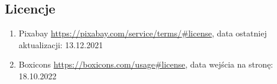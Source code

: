 \documentclass[12pt]{article}
\begin{document}
\begin{flushleft}
	
	


	
	
			
	\pagebreak
	\section{Licencje}
		\begin{enumerate}
			\item	Pixabay
			\url{https://pixabay.com/service/terms/#license}, 
			data ostatniej aktualizacji: 13.12.2021
			
			
			\item	Boxicons
			\url{https://boxicons.com/usage#license}, 
			data wejścia na stronę: 18.10.2022
		\end{enumerate}
	
	
	
%	
%	
	
\end{flushleft}
\end{document}

